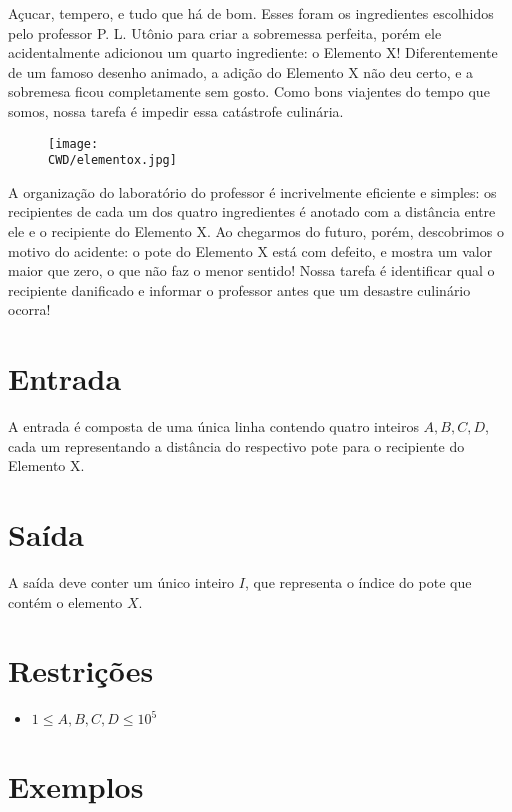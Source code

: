 Açucar, tempero, e tudo que há de bom. Esses foram os ingredientes escolhidos pelo professor P. L. Utônio para criar a sobremessa perfeita,
porém ele acidentalmente adicionou um quarto ingrediente: o Elemento X! Diferentemente de um famoso desenho animado, a adição do Elemento X não deu certo,
e a sobremesa ficou completamente sem gosto. Como bons viajentes do tempo que somos, nossa tarefa é impedir essa catástrofe culinária.

\begin{figure}[H]
    \centering
    \texttt{[image: \\CWD/elementox.jpg]}
\end{figure}

A organização do laboratório do professor é incrivelmente eficiente e simples: os recipientes de cada um dos quatro ingredientes
é anotado com a distância entre ele e o recipiente do Elemento X. Ao chegarmos do futuro, porém, descobrimos o motivo do acidente:
o pote do Elemento X está com defeito, e mostra um valor maior que zero, o que não faz o menor sentido!
Nossa tarefa é identificar qual o recipiente danificado e informar o professor antes que um desastre culinário ocorra!

\section*{Entrada}

A entrada é composta de uma única linha contendo quatro inteiros $A, B, C, D$, cada um representando a distância do respectivo pote
para o recipiente do Elemento X.

\section*{Saída}

A saída deve conter um único inteiro $I$, que representa o índice do pote que contém o elemento $X$.

\section*{Restrições}

\begin{itemize}
\item $ 1 \leq A, B, C, D \leq 10^5$
\end{itemize}


\section*{Exemplos}

\sampleio
